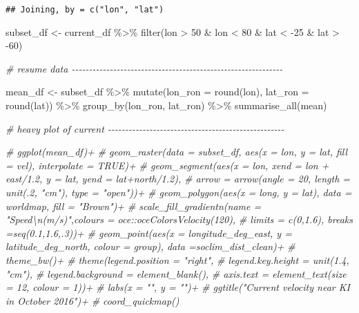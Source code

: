 \documentclass[
]{article}
\newenvironment{Shaded}{\begin{snugshade}}{\end{snugshade}}
\newcommand{\AttributeTok}[1]{\textcolor[rgb]{0.77,0.63,0.00}{#1}}
\newcommand{\CommentTok}[1]{\textcolor[rgb]{0.56,0.35,0.01}{\textit{#1}}}
\newcommand{\DecValTok}[1]{\textcolor[rgb]{0.00,0.00,0.81}{#1}}
\newcommand{\FunctionTok}[1]{\textcolor[rgb]{0.00,0.00,0.00}{#1}}
\newcommand{\NormalTok}[1]{#1}
\newcommand{\OtherTok}[1]{\textcolor[rgb]{0.56,0.35,0.01}{#1}}
\newcommand{\SpecialCharTok}[1]{\textcolor[rgb]{0.00,0.00,0.00}{#1}}
\begin{document}
\begin{verbatim}
## Joining, by = c("lon", "lat")
\end{verbatim}

\begin{Shaded}
\begin{Highlighting}[]
\NormalTok{subset\_df }\OtherTok{\textless{}{-}}\NormalTok{ current\_df }\SpecialCharTok{\%\textgreater{}\%} \FunctionTok{filter}\NormalTok{(lon }\SpecialCharTok{\textgreater{}} \DecValTok{50} \SpecialCharTok{\&}\NormalTok{ lon }\SpecialCharTok{\textless{}} \DecValTok{80} \SpecialCharTok{\&}\NormalTok{ lat }\SpecialCharTok{\textless{}} \SpecialCharTok{{-}}\DecValTok{25} \SpecialCharTok{\&}\NormalTok{ lat }\SpecialCharTok{\textgreater{}} \SpecialCharTok{{-}}\DecValTok{60}\NormalTok{)}

\CommentTok{\# resume data {-}{-}{-}{-}{-}{-}{-}{-}{-}{-}{-}{-}{-}{-}{-}{-}{-}{-}{-}{-}{-}{-}{-}{-}{-}{-}{-}{-}{-}{-}{-}{-}{-}{-}{-}{-}{-}{-}{-}{-}{-}{-}{-}{-}{-}{-}{-}{-}{-}{-}{-}{-}{-}{-}{-}{-}{-}{-}{-}{-}{-}}



\NormalTok{mean\_df }\OtherTok{\textless{}{-}}\NormalTok{ subset\_df }\SpecialCharTok{\%\textgreater{}\%} \FunctionTok{mutate}\NormalTok{(}\AttributeTok{lon\_ron =} \FunctionTok{round}\NormalTok{(lon),}
                                \AttributeTok{lat\_ron =} \FunctionTok{round}\NormalTok{(lat)) }\SpecialCharTok{\%\textgreater{}\%} 
  \FunctionTok{group\_by}\NormalTok{(lon\_ron, lat\_ron) }\SpecialCharTok{\%\textgreater{}\%} 
  \FunctionTok{summarise\_all}\NormalTok{(mean)}

\CommentTok{\# heavy plot of current {-}{-}{-}{-}{-}{-}{-}{-}{-}{-}{-}{-}{-}{-}{-}{-}{-}{-}{-}{-}{-}{-}{-}{-}{-}{-}{-}{-}{-}{-}{-}{-}{-}{-}{-}{-}{-}{-}{-}{-}{-}{-}{-}{-}{-}{-}{-}{-}{-}{-}{-}}


\CommentTok{\# ggplot(mean\_df)+}
\CommentTok{\#   geom\_raster(data = subset\_df, aes(x = lon, y = lat, fill = vel), interpolate = TRUE)+}
\CommentTok{\#   geom\_segment(aes(x = lon, xend = lon + east/1.2, y = lat, yend = lat+north/1.2), }
\CommentTok{\#                arrow = arrow(angle = 20, length = unit(.2, "cm"), type = "open"))+}
\CommentTok{\#   geom\_polygon(aes(x = long, y = lat), data = worldmap, fill = "Brown")+}
\CommentTok{\#   scale\_fill\_gradientn(name = "Speed\textbackslash{}n(m/s)",colours = oce::oceColorsVelocity(120), }
  \CommentTok{\#                      limits = c(0,1.6), breaks =seq(0.1,1.6,.3))+}
  \CommentTok{\# geom\_point(aes(x = longitude\_deg\_east, y = latitude\_deg\_north, colour = group), data =soclim\_dist\_clean)+}
  \CommentTok{\# theme\_bw()+}
  \CommentTok{\# theme(legend.position = "right",}
  \CommentTok{\#       legend.key.height = unit(1.4, "cm"), }
  \CommentTok{\#       legend.background = element\_blank(),}
  \CommentTok{\#       axis.text = element\_text(size = 12, colour = 1))+}
  \CommentTok{\# labs(x = "", y = "")+}
  \CommentTok{\# ggtitle("Current velocity near KI in October 2016")+}
  \CommentTok{\# coord\_quickmap()}


\end{Highlighting}
\end{Shaded}
\end{document}
